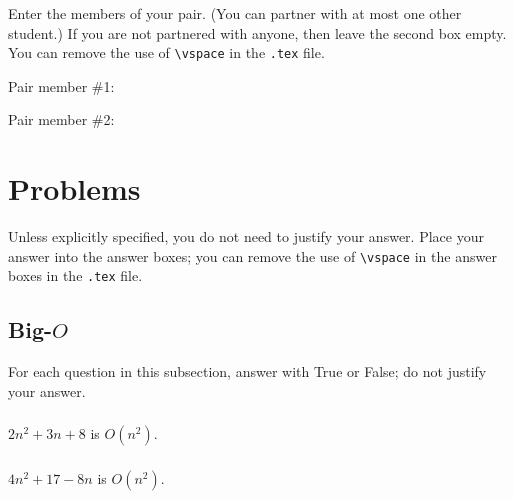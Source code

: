 \documentclass{article}
\begin{document}
Enter the members of your pair. (You can partner with at most one other student.) If you are not partnered with anyone, then leave the second box empty. You can remove the use of \lstinline{\vspace} in the \lstinline{.tex} file.

Pair member \#1:

\begin{mdframed}
\vspace{3em}
\end{mdframed}

Pair member \#2:

\begin{mdframed}
\vspace{3em}
\end{mdframed}

\section{Problems}

Unless explicitly specified, you do not need to justify your answer. Place your answer into the answer boxes; you can remove the use of \lstinline{\vspace} in the answer boxes in the \lstinline{.tex} file.

\subsection{Big-$O$}

For each question in this subsection, answer with True or False; do not justify your answer.

\subsubsection{}

$2n^2 + 3n + 8$ is $O(n^2)$.

\begin{mdframed}
\vspace{3em}
\end{mdframed}

\subsubsection{}

$4n^2 + 17 - 8n$ is $O(n^2)$.

\begin{mdframed}
\vspace{3em}
\end{mdframed}
\end{document}
